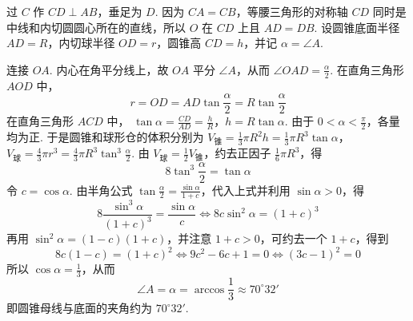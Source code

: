 \begin{solution}
过 \(C\) 作 \(CD\perp AB\)，垂足为 \(D\). 因为 \(CA=CB\)，等腰三角形的对称轴 \(CD\) 同时是中线和内切圆圆心所在的直线，所以 \(O\) 在 \(CD\) 上且 \(AD=DB\). 设圆锥底面半径 \(AD=R\)，内切球半径 \(OD=r\)，圆锥高 \(CD=h\)，并记 \(\alpha=\angle A\).

连接 \(OA\). 内心在角平分线上，故 \(OA\) 平分 \(\angle A\)，从而 \(\angle OAD=\frac{\alpha}{2}\). 在直角三角形 \(AOD\) 中，
\[
r=OD=AD\tan\frac{\alpha}{2}=R\tan\frac{\alpha}{2}
\]
在直角三角形 \(ACD\) 中，
\(\tan\alpha=\frac{CD}{AD}=\frac{h}{R}\)，\(h=R\tan\alpha\).
由于 \(0<\alpha<\frac{\pi}{2}\)，各量均为正. 于是圆锥和球形仓的体积分别为
\(V_{\text{锥}}=\frac{1}{3}\pi R^{2}h=\frac{1}{3}\pi R^{3}\tan\alpha\)，\(V_{\text{球}}=\frac{4}{3}\pi r^{3}=\frac{4}{3}\pi R^{3}\tan^{3}\frac{\alpha}{2}\).
由 \(V_{\text{球}}=\frac{1}{2}V_{\text{锥}}\)，约去正因子 \(\frac{1}{6}\pi R^{3}\)，得
\[
8\tan^{3}\frac{\alpha}{2}=\tan\alpha
\]
令 \(c=\cos\alpha\). 由半角公式 \(\tan\frac{\alpha}{2}=\frac{\sin\alpha}{1+c}\)，代入上式并利用 \(\sin\alpha>0\)，得
\[
8\frac{\sin^{3}\alpha}{(1+c)^{3}}=\frac{\sin\alpha}{c}
\Longleftrightarrow
8c\sin^{2}\alpha=(1+c)^{3}
\]
再用 \(\sin^{2}\alpha=(1-c)(1+c)\)，并注意 \(1+c>0\)，可约去一个 \(1+c\)，得到
\[
8c(1-c)=(1+c)^{2}
\Longleftrightarrow
9c^{2}-6c+1=0
\Longleftrightarrow
(3c-1)^{2}=0
\]
所以 \(\cos\alpha=\frac{1}{3}\)，从而
\[
\angle A=\alpha=\arccos\frac{1}{3}\approx70^{\circ}32'
\]
即圆锥母线与底面的夹角约为 \(70^{\circ}32'\).
\end{solution}
